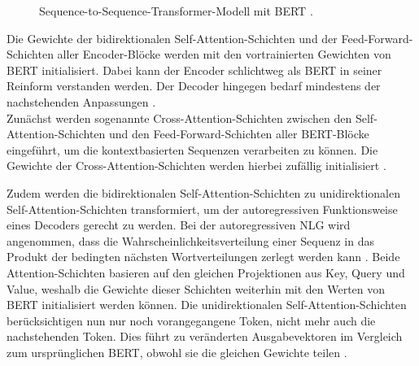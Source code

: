 \begin{figure}[h!]
  \centering
  \caption{Sequence-to-Sequence-Transformer-Modell mit BERT \cite{VON20}.}
  \label{pic:EncoderDecoderBert}
\end{figure}

\noindent
Die Gewichte der bidirektionalen Self-Attention-Schichten und der Feed-Forward-Schichten aller Encoder-Blöcke werden mit den vortrainierten Gewichten von \ac{BERT} initialisiert. Dabei kann der Encoder schlichtweg als \ac{BERT} in seiner Reinform verstanden werden. Der Decoder hingegen bedarf mindestens der nachstehenden Anpassungen \cite{VON20}.\\

\noindent
Zunächst werden sogenannte Cross-Attention-Schichten zwischen den Self-Attention-Schichten und den Feed-Forward-Schichten aller \ac{BERT}-Blöcke eingeführt, um die kontextbasierten Sequenzen verarbeiten zu können. Die Gewichte der Cross-Attention-Schichten werden hierbei zufällig initialisiert \cite{VON20}.
\newpage

\noindent
Zudem werden die bidirektionalen Self-Attention-Schichten zu unidirektionalen Self-Attention-Schichten transformiert, um der autoregressiven Funktionsweise eines Decoders gerecht zu werden. Bei der autoregressiven \ac{NLG} wird angenommen, dass die Wahrscheinlichkeitsverteilung einer Sequenz in das Produkt der bedingten nächsten Wortverteilungen zerlegt werden kann \cite{VON20}. Beide Attention-Schichten basieren auf den gleichen Projektionen aus Key, Query und Value, weshalb die Gewichte dieser Schichten weiterhin mit den Werten von \ac{BERT} initialisiert werden können. Die unidirektionalen Self-Attention-Schichten berücksichtigen nun nur noch vorangegangene Token, nicht mehr auch die nachstehenden Token. Dies führt zu veränderten Ausgabevektoren im Vergleich zum ursprünglichen \ac{BERT}, obwohl sie die gleichen Gewichte teilen \cite[S.~2]{ROT20}.\\

